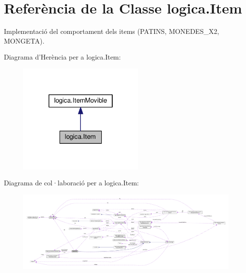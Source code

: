 \hypertarget{classlogica_1_1_item}{\section{Referència de la Classe logica.\+Item}
\label{classlogica_1_1_item}
}


Implementació del comportament dels items (P\+A\+T\+I\+N\+S, M\+O\+N\+E\+D\+E\+S\+\_\+\+X2, M\+O\+N\+G\+E\+T\+A).  




Diagrama d'Herència per a logica.\+Item\+:
\nopagebreak
\begin{figure}[H]
\begin{center}
\leavevmode
\includegraphics[width=178pt]{classlogica_1_1_item__inherit__graph}
\end{center}
\end{figure}


Diagrama de col·laboració per a logica.\+Item\+:
\nopagebreak
\begin{figure}[H]
\begin{center}
\leavevmode
\includegraphics[width=350pt]{classlogica_1_1_item__coll__graph}
\end{center}
\end{figure}
